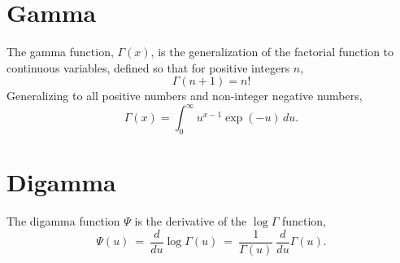 \section{Gamma}\label{gamma-appendix.section}

The gamma function, $\Gamma(x)$, is the generalization of the
factorial function to continuous variables, defined so that for
positive integers $n$,
\[
\Gamma(n+1) = n!
\]
%
Generalizing to all positive numbers and non-integer negative numbers,
\[
\Gamma(x) = \int_0^{\infty} u^{x - 1} \exp(-u) \, du.
\]


\section{Digamma}\label{digamma-appendix.section}

The digamma function $\Psi$ is the derivative of the $\log \Gamma$
function,
%
\[
\Psi(u)
\ = \
\frac{d}{d u} \log \Gamma(u)
\ = \
\frac{1}{\Gamma(u)} \ \frac{d}{d u} \Gamma(u).
\]
